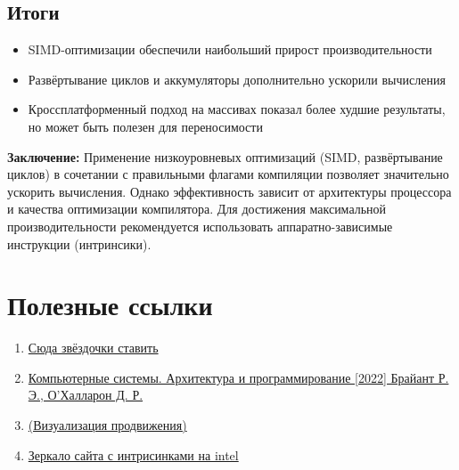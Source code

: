\documentclass[12pt,a4paper]{article}
\begin{document}
\subsection{Итоги}
\begin{itemize}
    \item SIMD-оптимизации обеспечили наибольший прирост производительности
    \item Развёртывание циклов и аккумуляторы дополнительно ускорили вычисления
    \item Кроссплатформенный подход на массивах показал более худшие результаты, но может быть полезен для переносимости
\end{itemize}

\textbf{Заключение:} Применение низкоуровневых оптимизаций (SIMD, развёртывание циклов) в сочетании с правильными флагами компиляции позволяет значительно ускорить вычисления. Однако эффективность зависит от архитектуры процессора и качества оптимизации компилятора. Для достижения максимальной производительности рекомендуется использовать аппаратно-зависимые инструкции (интринсики).

\section{Полезные ссылки}

\begin{enumerate}
    \item \href{https://github.com/kzueirf12345/mandelbrat2}{Сюда звёздочки ставить}
    \item \href{https://vk.com/wall-51126445_124413}{Компьютерные системы. Архитектура и программирование [2022] Брайант Р. Э., О'Халларон Д. Р.}
    \item \href{https://www.researchgate.net/figure/Data-Forwarding-1-With-a-forwarding-unit-these-stall-cycles-can-be-alleviated-See_fig2_308963446}{(Визуализация продвижения)}
    \item \href{https://www.laruence.com/sse/#techs=MMX,SSE,SSE2,SSE3,SSSE3,SSE4_1,SSE4_2,AVX,AVX2&expand=4974,4923,3865,3869,3870,736&text=mul}{Зеркало сайта с интрисинками на intel}
\end{enumerate}
\end{document}
